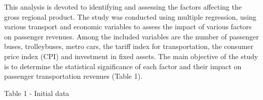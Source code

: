 \begin{multicols}{2}
This analysis is devoted to identifying and assessing the factors
affecting the gross regional product. The study was conducted using
multiple regression, using various transport and economic variables to
assess the impact of various factors on passenger revenues. Among the
included variables are the number of passenger buses, trolleybuses,
metro cars, the tariff index for transportation, the consumer price
index (CPI) and investment in fixed assets. The main objective of the
study is to determine the statistical significance of each factor and
their impact on passenger transportation revenues (Table 1).
\end{multicols}

\begin{table}[H]
\caption*{Table 1 - Initial data}
\centering
{}
\end{table}

